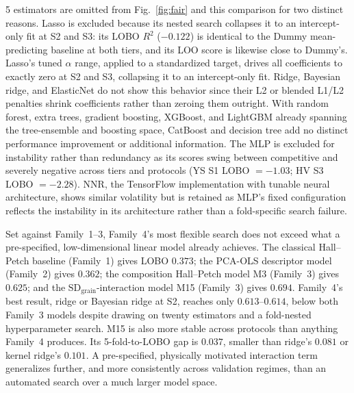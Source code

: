 \documentclass[5p,times,twocolumn]{elsarticle}
\begin{document}
5 estimators are omitted from Fig.~\ref{fig:fair} and this comparison for two distinct reasons. Lasso is excluded because its nested search collapses it to an intercept-only fit at S2 and S3: its LOBO $R^2$ ($-0.122$) is identical to the Dummy mean-predicting baseline at both tiers, and its LOO score is likewise close to Dummy's. Lasso's tuned $\alpha$ range, applied to a standardized target, drives all coefficients to exactly zero at S2 and S3, collapsing it to an intercept-only fit. Ridge, Bayesian ridge, and ElasticNet do not show this behavior since their L2 or blended L1/L2 penalties shrink coefficients rather than zeroing them outright. With random forest, extra trees, gradient boosting, XGBoost, and LightGBM already spanning the tree-ensemble and boosting space, CatBoost and decision tree add no distinct performance improvement or additional information. The MLP is excluded for instability rather than redundancy as its scores swing between competitive and severely negative across tiers and protocols (YS S1 LOBO $=-1.03$; HV S3 LOBO $=-2.28$). NNR, the TensorFlow implementation with tunable neural architecture, shows similar volatility but is retained as MLP's fixed configuration reflects the instability in its architecture rather than a fold-specific search failure.

Set against Family~1--3, Family~4's most flexible search does not exceed what a pre-specified, low-dimensional linear model already achieves. The classical Hall--Petch baseline (Family~1) gives LOBO $0.373$; the PCA-OLS descriptor model (Family~2) gives $0.362$; the composition Hall--Petch model M3 (Family~3) gives $0.625$; and the $\mathrm{SD}_{\mathrm{grain}}$-interaction model M15 (Family~3) gives $0.694$. Family~4's best result, ridge or Bayesian ridge at S2, reaches only $0.613$--$0.614$, below both Family~3 models despite drawing on twenty estimators and a fold-nested hyperparameter search. M15 is also more stable across protocols than anything Family~4 produces. Its 5-fold-to-LOBO gap is $0.037$, smaller than ridge's $0.081$ or kernel ridge's $0.101$. A pre-specified, physically motivated interaction term generalizes further, and more consistently across validation regimes, than an automated search over a much larger model space.
\end{document}
